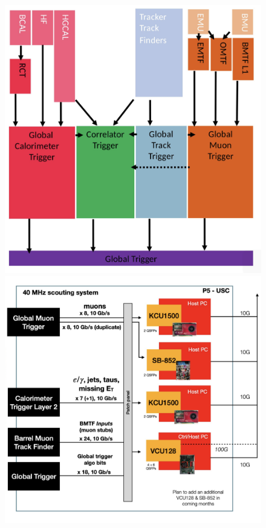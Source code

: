 \begin{figure}[t]
  \centering
  \begin{minipage}[b]{0.43\textwidth}
      \centering
      \includegraphics[width=\textwidth]{../ImmaginiTesi/Phase2.png} 
    \end{minipage}
    \hfill 
    \begin{minipage}[b]{0.48\textwidth}
      \centering
      \includegraphics[width=\textwidth]{../ImmaginiTesi/DataScoutingRun3.png} 
  \end{minipage}
  \caption{}
  \label{fig:Scouting}
\end{figure}


